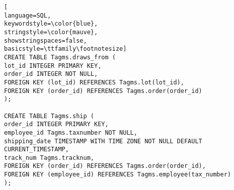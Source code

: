 \begin{lstlisting}[
language=SQL,
keywordstyle=\color{blue},
stringstyle=\color{mauve},
showstringspaces=false,
basicstyle=\ttfamily\footnotesize]
CREATE TABLE Tagms.draws_from (
lot_id INTEGER PRIMARY KEY,
order_id INTEGER NOT NULL,
FOREIGN KEY (lot_id) REFERENCES Tagms.lot(lot_id),
FOREIGN KEY (order_id) REFERENCES Tagms.order(order_id)
);

CREATE TABLE Tagms.ship (
order_id INTEGER PRIMARY KEY,
employee_id Tagms.taxnumber NOT NULL,
shipping_date TIMESTAMP WITH TIME ZONE NOT NULL DEFAULT CURRENT_TIMESTAMP,
track_num Tagms.tracknum,
FOREIGN KEY (order_id) REFERENCES Tagms.order(order_id),
FOREIGN KEY (employee_id) REFERENCES Tagms.employee(tax_number)
);

\end{lstlisting}